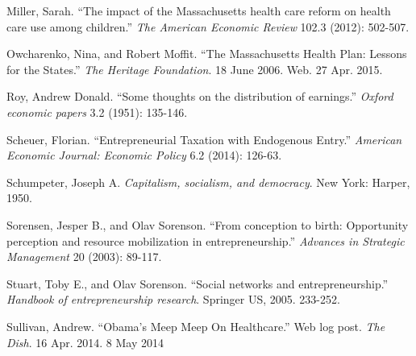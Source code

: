 \documentclass[12pt]{article}
\begin{document}
\begin{thebibliography}{99}
\begin{comment}



\bibitem{himmelstein}
Himmelstein, David U., Deborah Thorne, and Steffie Woolhandler. ``Medical Bankruptcy in Massachusetts: Has Health Reform Made a Difference?'' The American Journal of Medicine 124 (2011): 224-28.

\bibitem{nvca}
National Venture Captial Association. ``Q3 2014 Regional Data: Investments by State'' http://nvca.org/research/venture-investment/

\bibitem{sorensen}
Sorensen, J. B., and M. A. Fassiotto. ``Organizations as Fonts of Entrepreneurship.'' \emph{Organization Science} 22 (2011): 1322-331.



\end{comment}

Miller, Sarah. ``The impact of the Massachusetts health care reform on health care use among children.'' \emph{The American Economic Review} 102.3 (2012): 502-507.

Owcharenko, Nina, and Robert Moffit. ``The Massachusetts Health Plan: Lessons for the States.'' \emph{The Heritage Foundation}. 18 June 2006. Web. 27 Apr. 2015.

Roy, Andrew Donald. ``Some thoughts on the distribution of earnings.'' \emph{Oxford economic papers} 3.2 (1951): 135-146.


Scheuer, Florian. ``Entrepreneurial Taxation with Endogenous Entry.'' \emph{American Economic Journal: Economic Policy} 6.2 (2014): 126-63.

Schumpeter, Joseph A. \emph{Capitalism, socialism, and democracy}. New York: Harper, 1950. 

Sorensen, Jesper B., and Olav Sorenson. ``From conception to birth: Opportunity perception and resource mobilization in entrepreneurship.'' \emph{Advances in Strategic Management} 20 (2003): 89-117.

Stuart, Toby E., and Olav Sorenson. ``Social networks and entrepreneurship.'' \emph{Handbook of entrepreneurship research}. Springer US, 2005. 233-252.

Sullivan, Andrew. ``Obama's Meep Meep On Healthcare.'' Web log post. \emph{The Dish}. 16 Apr. 2014. 8 May 2014 


\end{thebibliography}
\end{document}
